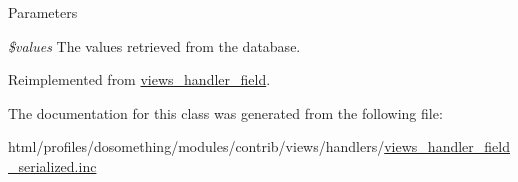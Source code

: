 \begin{DoxyParams}{Parameters}
\item[{\em \$values}]The values retrieved from the database. \end{DoxyParams}


Reimplemented from \hyperlink{classviews__handler__field_a82ff951c5e9ceb97b2eab86f880cbc1e}{views\_\-handler\_\-field}.

The documentation for this class was generated from the following file:\begin{DoxyCompactItemize}
\item 
html/profiles/dosomething/modules/contrib/views/handlers/\hyperlink{views__handler__field__serialized_8inc}{views\_\-handler\_\-field\_\-serialized.inc}\end{DoxyCompactItemize}
